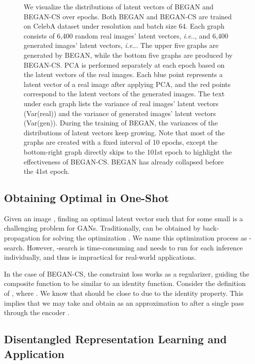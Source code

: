 \documentclass[runningheads]{llncs}
\makeatletter
\DeclareRobustCommand\onedot{\futurelet\@let@token\@onedot}
\def\@onedot{\ifx\@let@token.\else.\null\fi\xspace}
\def\ie{\emph{i.e}\onedot} \def\Ie{\emph{I.e}\onedot}
\makeatother
\begin{document}
\begin{figure}[!b]
        \caption{We visualize the distributions of latent vectors of BEGAN and BEGAN-CS over epochs. Both BEGAN and BEGAN-CS are trained on CelebA dataset under  resolution and batch size 64. Each graph consists of 6{,}400 random real images' latent vectors, \ie , and 6{,}400 generated images' latent vectors, \ie . The upper five graphs are generated by BEGAN, while the bottom five graphs are produced by BEGAN-CS. PCA is performed separately at each epoch based on the latent vectors of the real images. Each blue point represents a latent vector of a real image after applying PCA, and the red points correspond to the latent vectors of the generated images. The text under each graph lists the variance of real images' latent vectors (Var(real)) and the variance of generated images' latent vectors (Var(gen)). During the training of BEGAN, the variances of the distributions of latent vectors keep growing. Note that most of the graphs are created with a fixed interval of 10 epochs, except the bottom-right graph directly skips to the 101st epoch to highlight the effectiveness of BEGAN-CS. BEGAN has already collapsed before the 41st epoch.}\label{fig:PCA-analysis}
    \end{figure}   
   
    
    \subsection{Obtaining Optimal  in One-Shot}
    \label{subsection:obtain-z-in-one-shot}
    
    Given an image , finding an optimal latent vector  such that  for some small  is a challenging problem for GANs. Traditionally,  can be obtained by back-propagation for solving the optimization . We name this optimization process as -search. However, -search is  time-consuming and needs to run for each inference individually, and thus is impractical for real-world applications.
    
    In the case of BEGAN-CS, the constraint loss works as a regularizer, guiding the composite function  to be similar to an identity function.
    Consider the definition of , where . We know that  should be close to  due to the identity property. This implies that we may take  and obtain  as an approximation to  after a single pass through the encoder .
    
    \subsection{Disentangled Representation Learning and Application}
    \label{subsection:method-disentangled-representation-and-application}
    
\end{document}
